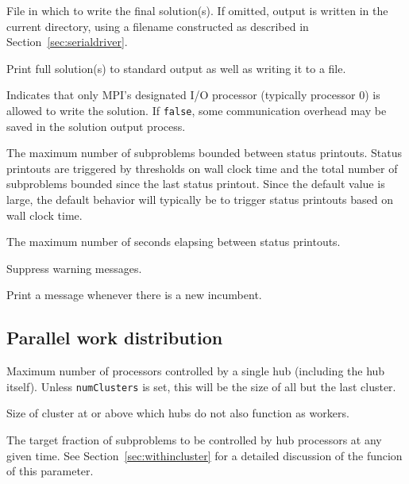 File in which to write the final solution(s).  If omitted, output is
written in the current directory, using a filename constructed as
described in Section~\ref{sec:serialdriver}.

Print full solution(s) to standard output as well as writing it to a file.

 Indicates that only
MPI's designated I/O processor (typically processor 0) is allowed to
write the solution.  If \texttt{false}, some communication overhead
may be saved in the solution output process.

The maximum number of subproblems bounded between status printouts.
Status printouts are triggered by thresholds on wall clock time and the
total number of subproblems bounded since the last status printout.
Since the default value is large, the default behavior will typically
be to trigger status printouts based on wall clock time.

The maximum number of seconds elapsing between status printouts.

Suppress warning messages.

Print a message whenever there is a new incumbent.

\subsection{Parallel work distribution}
\vspace{-3ex}
Maximum number of processors controlled by a single hub (including the
hub itself).  Unless \texttt{numClusters} is set, this will be the
size of all but the last cluster.

Size of cluster at or above which hubs do not also function as
workers.

The target fraction of subproblems to be controlled by hub
processors at any given time.  See Section~\ref{sec:withincluster} for
a detailed discussion of the funcion of this parameter.

